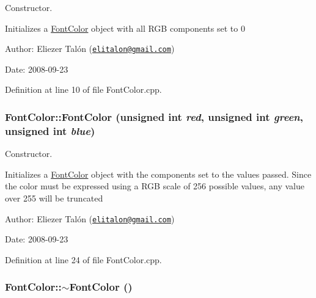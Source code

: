 Constructor. 

Initializes a \hyperlink{struct_font_color}{FontColor} object with all RGB components set to 0

\begin{Desc}
\item[Author:]Eliezer Talón (\href{mailto:elitalon@gmail.com}{\tt elitalon@gmail.com}) \end{Desc}
\begin{Desc}
\item[Date:]2008-09-23 \end{Desc}


Definition at line 10 of file FontColor.cpp.\hypertarget{struct_font_color_6db5f801f533eb648881ba1fdd1f1b84}{
\subsubsection[FontColor]{\setlength{\rightskip}{0pt plus 5cm}FontColor::FontColor (unsigned int {\em red}, \/  unsigned int {\em green}, \/  unsigned int {\em blue})}}
\label{struct_font_color_6db5f801f533eb648881ba1fdd1f1b84}


Constructor. 

Initializes a \hyperlink{struct_font_color}{FontColor} object with the components set to the values passed. Since the color must be expressed using a RGB scale of 256 possible values, any value over 255 will be truncated

\begin{Desc}
\item[Author:]Eliezer Talón (\href{mailto:elitalon@gmail.com}{\tt elitalon@gmail.com}) \end{Desc}
\begin{Desc}
\item[Date:]2008-09-23 \end{Desc}


Definition at line 24 of file FontColor.cpp.\hypertarget{struct_font_color_660917a7d04fdf47910573165f67cdaa}{
\subsubsection[$\sim$FontColor]{\setlength{\rightskip}{0pt plus 5cm}FontColor::$\sim$FontColor ()}}
\label{struct_font_color_660917a7d04fdf47910573165f67cdaa}


